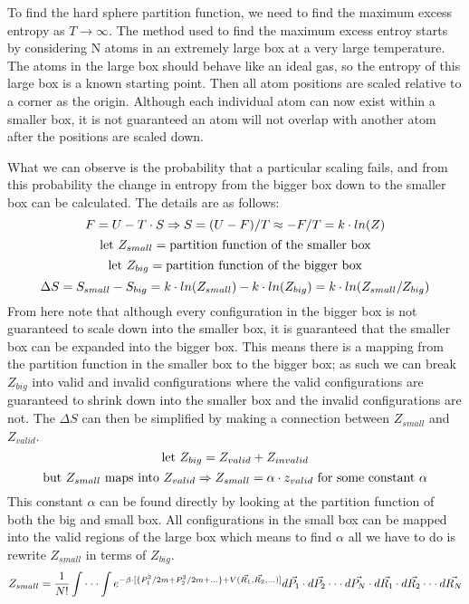 To find the hard sphere partition function, we need to find the maximum excess entropy as $T\to\infty$. The method used to find the maximum excess entroy starts by considering N atoms in an extremely large box at a very large temperature. The atoms in the large box should behave like an ideal gas, so the entropy of this large box is a known starting point. Then all atom positions are scaled relative to a corner as the origin. Although each individual atom can now exist within a smaller box, it is not guaranteed an atom will not overlap with another atom after the positions are scaled down.

What we can observe is the probability that a particular scaling fails, and from this probability the change in entropy from the bigger box down to the smaller box can be calculated. The details are as follows:
$$\newline F=U-T\cdot S \Rightarrow  S=(U-F)/T\approx -F/T=k\cdot ln(Z)$$
$$\text{let }Z_{small}=\text{partition function of the smaller box}\newline$$
$$\text{let }Z_{big}=\text{partition function of the bigger box}\newline$$
$$\Delta S=S_{small}-S_{big}=k\cdot ln(Z_{small})-k\cdot ln(Z_{big})=k\cdot ln(Z_{small}/Z_{big})\newline$$
From here note that although every configuration in the bigger box is not guaranteed to scale down into the smaller box, it is guaranteed that the smaller box can be expanded into the bigger box. This means there is a mapping from the partition function in the smaller box to the bigger box; as such we can break $Z_{big}$ into valid and invalid configurations where the valid configurations are guaranteed to shrink down into the smaller box and the invalid configurations are not. The $\Delta S$ can then be simplified by making a connection between $Z_{small}$ and $Z_{valid}$.
$$\newline \text{let }Z_{big}=Z_{valid}+Z_{invalid}\newline$$
$$\text{but }Z_{small}\text{ maps into }Z_{valid} \Rightarrow Z_{small}=\alpha\cdot z_{valid}\text{ for some constant } \alpha\newline$$
This constant $\alpha$ can be found directly by looking at the partition function of both the big and small box. All configurations in the small box can be mapped into the valid regions of the large box which means to find $\alpha$ all we have to do is rewrite $Z_{small}$ in terms of $Z_{big}$.
$$\newline Z_{small}=\frac{1}{N!}\int\cdot\cdot\cdot\int e^{-\beta\cdot [\{P_{1}^2/{2m}+P_{2}^2/{2m}+...\}+V(\vec{R_1},\vec{R_2},...)]}d\vec{P_1}\cdot d\vec{P_2}\cdot\cdot\cdot d\vec{P_N}\cdot d\vec{R_1}\cdot d\vec{R_2}\cdot\cdot\cdot d\vec{R_N}$$
